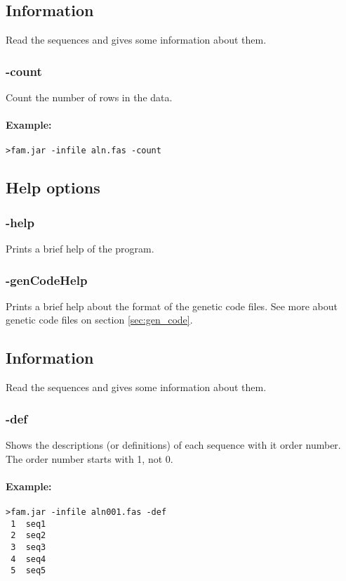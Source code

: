 \documentclass[a4paper, twoside,10pt]{article}
\begin{document}
\subsection{Information}
Read the sequences and gives some information about them.

\subsubsection{-count}
Count the number of rows in the data.
\paragraph{Example:}
\begin{verbatim}
>fam.jar -infile aln.fas -count
\end{verbatim}

\subsection{Help options}
\subsubsection{-help}
Prints a brief help of the program.
\subsubsection{-genCodeHelp}
Prints a brief help about the format of the genetic code files. See more 
about genetic code files on section \ref{sec:gen_code}. 

\subsection{Information}
Read the sequences and gives some information about them.

\subsubsection{-def}
Shows the descriptions (or definitions) of each sequence with it order number.
The order number starts with 1, not 0.  
\paragraph{Example:}
\begin{verbatim}
>fam.jar -infile aln001.fas -def
 1	seq1
 2	seq2
 3	seq3
 4	seq4
 5	seq5
\end{verbatim}
\end{document}
